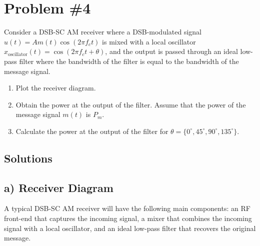 \documentclass{article}
\begin{document}
\newpage

\section*{Problem \#4}
Consider a DSB-SC AM receiver where a DSB-modulated signal \( u(t) = A m(t) \cos (2\pi f_c t) \) is mixed with a local oscillator \( x_{\text{oscillator}}(t) = \cos(2\pi f_c t + \theta) \), and the output is passed through an ideal low-pass filter where the bandwidth of the filter is equal to the bandwidth of the message signal.
\begin{enumerate}
    \item Plot the receiver diagram.
    \item Obtain the power at the output of the filter. Assume that the power of the message signal \( m(t) \) is \( P_m \).
    \item Calculate the power at the output of the filter for \( \theta = \{0^\circ, 45^\circ, 90^\circ, 135^\circ\} \).
\end{enumerate}

\subsection*{Solutions}

\subsection*{a) Receiver Diagram}
A typical DSB-SC AM receiver will have the following main components: an RF front-end that captures the incoming signal, a mixer that combines the incoming signal with a local oscillator, and an ideal low-pass filter that recovers the original message.

\end{document}

